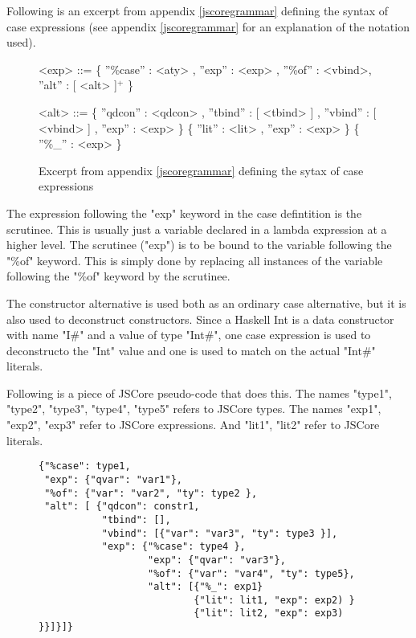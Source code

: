 Following is an excerpt from appendix \ref{jscoregrammar} defining the syntax 
of case expressions (see appendix \ref{jscoregrammar} for an explanation of the
notation used).

\begin{figure}[H]
\scriptsize
\begin{grammar}

<exp>		  ::= 	 \{ ''\%case'' : <aty> , ''exp'' : <exp> , ''\%of'' : <vbind>, ''alt'' : [ <alt> ]$^{+}$ \}	

<alt>		  ::= 	 \{ ''qdcon'' : <qdcon> , ''tbind'' : [ <tbind> ] , ''vbind'' : [ <vbind> ] , ''exp'' : <exp> \}
		  \alt 			 \{ ''lit'' : <lit> , ''exp'' : <exp> \}
		  \alt 			 \{ ''\%\_'' : <exp> \}	
\end{grammar}

\label{caseexpr}
\caption{Excerpt from appendix \ref{jscoregrammar} defining the sytax of case expressions}
\end{figure}

The expression following the "exp" keyword in the case defintition is the scrutinee. This
is usually just a variable declared in a lambda expression at a higher level.
The scrutinee ("exp") is to be bound to the variable following the "\%of" keyword.
This is simply done by replacing all instances of the variable following the "\%of" keyword
by the scrutinee.

The constructor alternative is used both as an ordinary case alternative, but it is
also used to deconstruct constructors. Since a Haskell Int is a data
constructor with name "I\#" and a value of type "Int\#", one case expression is used 
to deconstructo the "Int" value and one is used to match on the actual "Int\#" literals.

Following is a piece of JSCore pseudo-code that does this. 
The names "type1", "type2", "type3", "type4", "type5" refers to JSCore types. 
The names "exp1", "exp2", "exp3" refer to JSCore expressions. And "lit1", "lit2" refer
to JSCore literals.

\begin{figure}[H]
\lstset{ %
language=Haskell,
caption=JSCore case expression,
label=lst:int1
}
\begin{lstlisting}
{"%case": type1,
 "exp": {"qvar": "var1"},
 "%of": {"var": "var2", "ty": type2 },
 "alt": [ {"qdcon": constr1,
           "tbind": [],
           "vbind": [{"var": "var3", "ty": type3 }],
           "exp": {"%case": type4 },
                   "exp": {"qvar": "var3"},
                   "%of": {"var": "var4", "ty": type5},
                   "alt": [{"%_": exp1}
                           {"lit": lit1, "exp": exp2) }
                           {"lit": lit2, "exp": exp3) }}]}]}



\end{lstlisting}
\end{figure}

